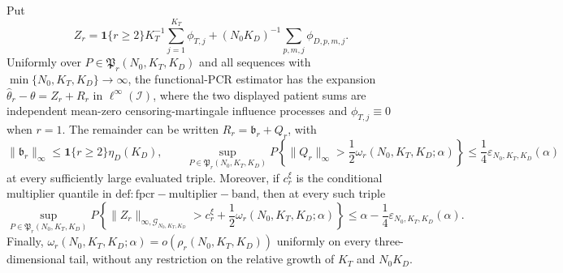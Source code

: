 Put
\[
 Z_r=\mathbf 1\{r\ge2\}K_T^{-1}\sum_{j=1}^{K_T}\phi_{T,j}+(N_0K_D)^{-1}\sum_{p,m,j}\phi_{D,p,m,j}.
\]
Uniformly over \(P\in\mathfrak P_r(N_0,K_T,K_D)\) and all sequences with \(\min\{N_0,K_T,K_D\}\to\infty\), the functional-PCR estimator has the expansion \(\widehat\theta_r-\theta=Z_r+R_r\) in \(\ell^\infty(\mathcal I)\), where the two displayed patient sums are independent mean-zero censoring-martingale influence processes and \(\phi_{T,j}\equiv0\) when \(r=1\).  The remainder can be written \(R_r=\mathfrak b_r+Q_r\), with
\[
 \|\mathfrak b_r\|_\infty\le \mathbf 1\{r\ge2\}\eta_D(K_D),
 \qquad
 \sup_{P\in\mathfrak P_r(N_0,K_T,K_D)}P\!\left\{\|Q_r\|_\infty>\frac12\omega_r(N_0,K_T,K_D;\alpha)\right\}
 \le\frac14\varepsilon_{N_0,K_T,K_D}(\alpha)
\]
at every sufficiently large evaluated triple.  Moreover, if \(c_r^\xi\) is the conditional multiplier quantile in \(\mathrm{def:fpcr-multiplier-band}\), then at every such triple
\[
 \sup_{P\in\mathfrak P_r(N_0,K_T,K_D)}P\!\left\{
 \|Z_r\|_{\infty,\mathcal G_{N_0,K_T,K_D}}>c_r^\xi+\frac12\omega_r(N_0,K_T,K_D;\alpha)
 \right\}
 \le \alpha-\frac14\varepsilon_{N_0,K_T,K_D}(\alpha).
\]
Finally, \(\omega_r(N_0,K_T,K_D;\alpha)=o(\rho_r(N_0,K_T,K_D))\) uniformly on every three-dimensional tail, without any restriction on the relative growth of \(K_T\) and \(N_0K_D\).